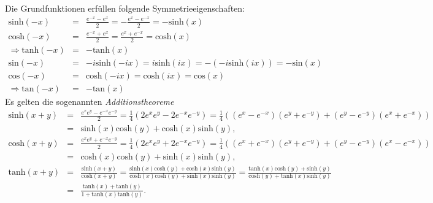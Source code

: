 \documentclass{book}
\renewcommand{\sinh}{\text{sinh}}
\renewcommand{\cosh}{\text{cosh}}
\renewcommand{\tanh}{\text{tanh}}
\renewcommand{\sin}{\text{sin}}
\renewcommand{\cos}{\text{cos}}
\renewcommand{\tan}{\text{tan}}
\begin{document}
%
Die Grundfunktionen erfüllen folgende Symmetrieeigenschaften:
%
\begin{eqnarray}
\sinh\left(-x\right) & = & \frac{e^{-x} - e^x}{2} = -\frac{e^{x} - e^{-x}}{2} = -\sinh\left(x\right)\\
\cosh\left(-x\right) & = & \frac{e^{-x} + e^x}{2} = \frac{e^{x} + e^{-x}}{2} = \cosh\left(x\right)\\
\Rightarrow \tanh\left(-x\right) & = & -\tanh\left(x\right)\\
\sin\left(-x\right) & = & -i\sinh\left(-ix\right) = i\sinh\left(ix\right) = -\left(-i\sinh\left(ix\right)\right) = -\sin\left(x\right)\\
\cos\left(-x\right) & = & \cosh\left(-ix\right) = \cosh\left(ix\right) = \cos\left(x\right)\\
\Rightarrow \tan\left(-x\right) & = & -\tan\left(x\right)
\end{eqnarray}
%
Es gelten die sogenannten \textit{Additionstheoreme}
%
\begin{eqnarray}
\sinh\left(x + y\right) & = & \frac{e^xe^y - e^{-x}e^{-y}}{2} = \frac{1}{4}\left(2e^xe^y - 2e^{-x}e^{-y}\right) = \frac{1}{4}\left(\left(e^x - e^{-x}\right)\left(e^y + e^{-y}\right) + \left(e^y - e^{-y}\right)\left(e^x + e^{-x}\right)\right)\nonumber\\
& = & \sinh\left(x\right)\cosh\left(y\right) + \cosh\left(x\right)\sinh\left(y\right), \label{eq:sinh_add_1}\\
\cosh\left(x + y\right) & = & \frac{e^xe^y + e^{-x}e^{-y}}{2} = \frac{1}{4}\left(2e^xe^y + 2e^{-x}e^{-y}\right) = \frac{1}{4}\left(\left(e^x + e^{-x}\right)\left(e^y + e^{-y}\right) + \left(e^y - e^{-y}\right)\left(e^x - e^{-x}\right)\right)\nonumber\\
& = & \cosh\left(x\right)\cosh\left(y\right) + \sinh\left(x\right)\sinh\left(y\right), \label{eq:cosh_add_1}\\
\tanh\left(x + y\right) & = & \frac{\sinh\left(x + y\right)}{\cosh\left(x + y\right)} = \frac{\sinh\left(x\right)\cosh\left(y\right) + \cosh\left(x\right)\sinh\left(y\right)}{\cosh\left(x\right)\cosh\left(y\right) + \sinh\left(x\right)\sinh\left(y\right)} = \frac{\tanh\left(x\right)\cosh\left(y\right) + \sinh\left(y\right)}{\cosh\left(y\right) + \tanh\left(x\right)\sinh\left(y\right)}\nonumber\\
& = & \frac{\tanh\left(x\right) + \tanh\left(y\right)}{1 + \tanh\left(x\right)\tanh\left(y\right)}.\label{eq:tanh_add_1}
\end{eqnarray}
\end{document}
